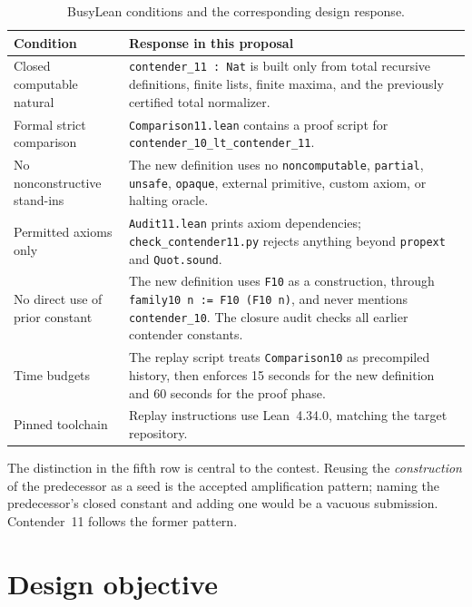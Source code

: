 \documentclass[11pt]{article}
\theoremstyle{definition}
\theoremstyle{remark}
\newcommand{\code}[1]{\texttt{#1}}
\begin{document}
\begin{table}[ht]
\centering
\caption{BusyLean conditions and the corresponding design response.}
\label{tab:rules}
\begin{tabular}{>{\raggedright\arraybackslash}p{} >{\raggedright\arraybackslash}p{}}
\toprule
Condition & Response in this proposal \\
\midrule
Closed computable natural & \code{contender\_11 : Nat} is built only from total recursive definitions, finite lists, finite maxima, and the previously certified total normalizer. \\
Formal strict comparison & \code{Comparison11.lean} contains a proof script for \code{contender\_10\_lt\_contender\_11}. \\
No nonconstructive stand-ins & The new definition uses no \code{noncomputable}, \code{partial}, \code{unsafe}, \code{opaque}, external primitive, custom axiom, or halting oracle. \\
Permitted axioms only & \code{Audit11.lean} prints axiom dependencies; \code{check\_contender11.py} rejects anything beyond \code{propext} and \code{Quot.sound}. \\
No direct use of prior constant & The new definition uses \code{F10} as a construction, through \code{family10 n := F10 (F10 n)}, and never mentions \code{contender\_10}. The closure audit checks all earlier contender constants. \\
Time budgets & The replay script treats \code{Comparison10} as precompiled history, then enforces 15 seconds for the new definition and 60 seconds for the proof phase. \\
Pinned toolchain & Replay instructions use Lean~4.34.0, matching the target repository. \\
\bottomrule
\end{tabular}
\end{table}

The distinction in the fifth row is central to the contest. Reusing the
\emph{construction} of the predecessor as a seed is the accepted amplification
pattern; naming the predecessor's closed constant and adding one would be a
vacuous submission. Contender~11 follows the former pattern.

\section{Design objective}
\end{document}
